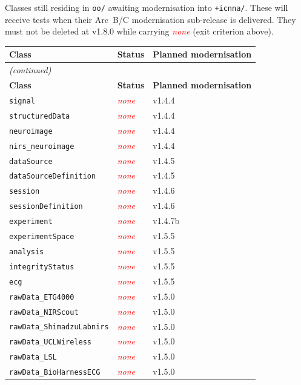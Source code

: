 \documentclass[11pt,a4paper]{article}
\newcommand{\statusNone}{\textcolor{red}{\textit{none}}}
\begin{document}
Classes still residing in \texttt{oo/} awaiting modernisation into
\texttt{+icnna/}. These will receive tests when their Arc~B/C modernisation
sub-release is delivered. They must not be deleted at v1.8.0 while carrying
\statusNone{} (exit criterion above).

\begin{longtable}{lll}
\toprule
\textbf{Class} & \textbf{Status} & \textbf{Planned modernisation} \\
\midrule
\endfirsthead
\multicolumn{3}{l}{\small\itshape (continued)} \\
\toprule
\textbf{Class} & \textbf{Status} & \textbf{Planned modernisation} \\
\midrule
\endhead
\bottomrule
\endfoot
\texttt{signal}                   & \statusNone & v1.4.4 \\
\texttt{structuredData}           & \statusNone & v1.4.4 \\
\texttt{neuroimage}               & \statusNone & v1.4.4 \\
\texttt{nirs\_neuroimage}         & \statusNone & v1.4.4 \\
\texttt{dataSource}               & \statusNone & v1.4.5 \\
\texttt{dataSourceDefinition}     & \statusNone & v1.4.5 \\
\texttt{session}                  & \statusNone & v1.4.6 \\
\texttt{sessionDefinition}        & \statusNone & v1.4.6 \\
\texttt{experiment}               & \statusNone & v1.4.7b \\
\texttt{experimentSpace}          & \statusNone & v1.5.5 \\
\texttt{analysis}                 & \statusNone & v1.5.5 \\
\texttt{integrityStatus}          & \statusNone & v1.5.5 \\
\texttt{ecg}                      & \statusNone & v1.5.5 \\
\texttt{rawData\_ETG4000}         & \statusNone & v1.5.0 \\
\texttt{rawData\_NIRScout}        & \statusNone & v1.5.0 \\
\texttt{rawData\_ShimadzuLabnirs} & \statusNone & v1.5.0 \\
\texttt{rawData\_UCLWireless}     & \statusNone & v1.5.0 \\
\texttt{rawData\_LSL}             & \statusNone & v1.5.0 \\
\texttt{rawData\_BioHarnessECG}   & \statusNone & v1.5.0 \\

\end{longtable}
\end{document}
